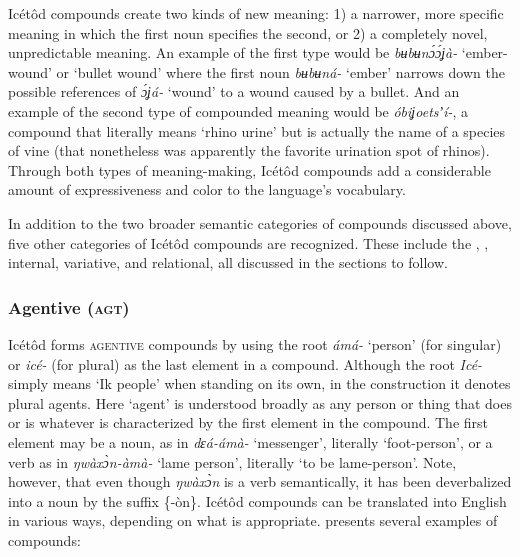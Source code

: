 Icétôd compounds create two kinds of new meaning: 1) a narrower, more specific meaning in which the first noun specifies the second, or 2) a completely novel, unpredictable meaning. An example of the first type would be \textit{bʉbʉn\'{ɔ}\'{ɔ}ʝà-} ‘ember-wound’ or ‘bullet wound’ where the first noun \textit{bʉbʉná-} ‘ember’ narrows down the possible references of \textit{\'{ɔ}ʝá-} ‘wound’ to a wound caused by a bullet. And an example of the second type of compounded meaning would be \textit{óbiʝoetsʼí-}, a compound that literally means ‘rhino urine’ but is actually the name of a species of vine (that nonetheless was apparently the favorite urination spot of rhinos). Through both types of meaning-making, Icétôd compounds add a considerable amount of expressiveness and color to the language’s vocabulary.

In addition to the two broader semantic categories of compounds discussed above, five other categories of Icétôd compounds are recognized. These include the , , internal, variative, and relational, all discussed in the sections to follow.


\subsubsection{Agentive (\textsc{agt})}\label{sec:4.3.1}
Icétôd forms \textsc{agentive} compounds by using the root \textit{ámá-} ‘person’ (for singular) or \textit{icé-} (for plural) as the last element in a compound. Although the root \textit{Icé-} simply means ‘Ik people’ when standing on its own, in the  construction it denotes plural agents. Here ‘agent’ is understood broadly as any person or thing that does or is whatever is characterized by the first element in the compound. The first element may be a noun, as in \textit{dɛá-ámà-} ‘messenger’, literally ‘foot-person’, or a verb as in \textit{ŋwàx\`{ɔ}n{\Ì}-àmà-} ‘lame person’, literally ‘to be lame-person’. Note, however, that even though \textit{ŋwàx\`{ɔ}n} is a verb semantically, it has been deverbalized into a noun by the  suffix \{-òn\}. Icétôd  compounds can be translated into English in various ways, depending on what is appropriate.  presents several examples of  compounds:


